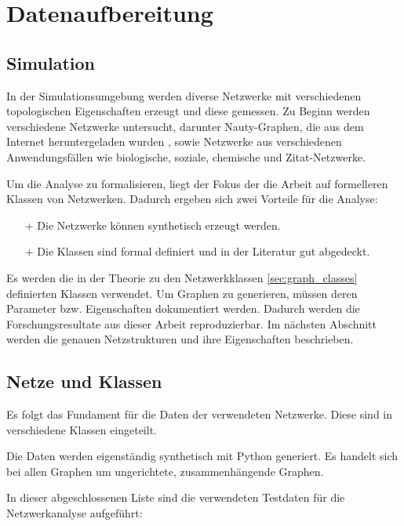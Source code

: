 \section{Datenaufbereitung}

\subsection{Simulation}

In der Simulationsumgebung werden diverse Netzwerke mit verschiedenen topologischen Eigenschaften erzeugt und diese gemessen.
Zu Beginn werden verschiedene Netzwerke untersucht, darunter Nauty-Graphen, die aus dem Internet heruntergeladen wurden \cite{mckay_practical_2014}, sowie Netzwerke aus verschiedenen Anwendungsfällen wie biologische, soziale, chemische und Zitat-Netzwerke.

Um die Analyse zu formalisieren, liegt der Fokus der die Arbeit auf formelleren Klassen von Netzwerken.
Dadurch ergeben sich zwei Vorteile für die Analyse:
\begin{itemize}
    \item [+] Die Netzwerke können synthetisch erzeugt werden.
    \item [+] Die Klassen sind formal definiert und in der Literatur gut abgedeckt.
\end{itemize}

Es werden die in der Theorie zu den Netzwerkklassen \ref{sec:graph_classes} definierten Klassen verwendet.
Um Graphen zu generieren, müssen deren Parameter bzw. Eigenschaften dokumentiert werden.
Dadurch werden die Forschungsresultate aus dieser Arbeit reproduzierbar.
Im nächsten Abschnitt werden die genauen Netzstrukturen und ihre Eigenschaften beschrieben.

\newpage

\subsection{Netze und Klassen}

Es folgt das Fundament für die Daten der verwendeten Netzwerke.
Diese sind in verschiedene Klassen eingeteilt.

Die Daten werden eigenständig synthetisch mit Python generiert.
Es handelt sich bei allen Graphen um ungerichtete, zusammenhängende Graphen.

In dieser abgeschlossenen Liste sind die verwendeten Testdaten für die Netzwerkanalyse aufgeführt:

